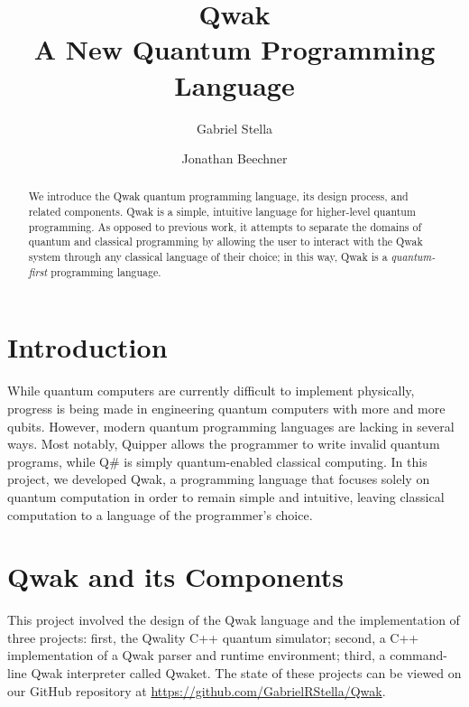 \documentclass{article}
\begin{document}
%
%
\title{Qwak \\ A New Quantum Programming Language}
\author[1]{Gabriel Stella}
\author[1]{Jonathan Beechner}
\date{}

\maketitle

\begin{abstract}
We introduce the Qwak quantum programming language, its design process, and related components. Qwak is a simple, intuitive language for higher-level quantum programming. As opposed to previous work, it attempts to separate the domains of quantum and classical programming by allowing the user to interact with the Qwak system through any classical language of their choice; in this way, Qwak is a \textit{quantum-first} programming language.
\end{abstract}



\section{Introduction}

While quantum computers are currently difficult to implement physically, progress is being made in engineering quantum computers with more and more qubits. However, modern quantum programming languages are lacking in several ways. Most notably, Quipper allows the programmer to write invalid quantum programs, while Q\# is simply quantum-enabled classical computing. In this project, we developed Qwak, a programming language that focuses solely on quantum computation in order to remain simple and intuitive, leaving classical computation to a language of the programmer’s choice.

\section{Qwak and its Components}

This project involved the design of the Qwak language and the implementation of three projects: first, the Qwality C++ quantum simulator; second, a C++ implementation of a Qwak parser and runtime environment; third, a command-line Qwak interpreter called Qwaket. The state of these projects can be viewed on our GitHub repository at \url{https://github.com/GabrielRStella/Qwak}.
\end{document}
